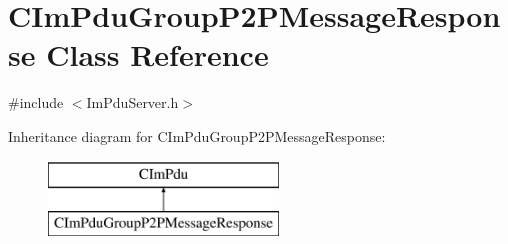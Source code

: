 \hypertarget{class_c_im_pdu_group_p2_p_message_response}{}\section{C\+Im\+Pdu\+Group\+P2\+P\+Message\+Response Class Reference}
\label{class_c_im_pdu_group_p2_p_message_response}


{\ttfamily \#include $<$Im\+Pdu\+Server.\+h$>$}

Inheritance diagram for C\+Im\+Pdu\+Group\+P2\+P\+Message\+Response\+:\begin{figure}[H]
\begin{center}
\leavevmode
\includegraphics[height=2.000000cm]{class_c_im_pdu_group_p2_p_message_response}
\end{center}
\end{figure}
